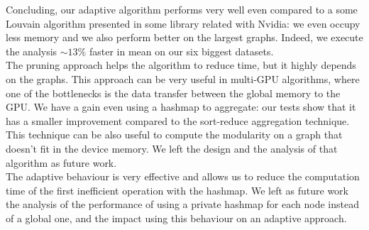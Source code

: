 Concluding, our adaptive algorithm performs very well even compared to a some Louvain algorithm presented in some library related with Nvidia: we even occupy less memory and we also perform better on the largest graphs. Indeed, we execute the analysis $\sim 13\%$ faster in mean on our six biggest datasets.\\ The pruning approach helps the algorithm to reduce time, but it highly depends on the graphs. This approach can be very useful in multi-GPU algorithms, where one of the bottlenecks is the data transfer between the global memory to the GPU. We have a gain even using a hashmap to aggregate: our tests show that it has a smaller improvement compared to the sort-reduce aggregation technique. This technique can be also useful to compute the modularity on a graph that doesn't fit in the device memory. We left the design and the analysis of that algorithm as future work. \\
The adaptive behaviour is very effective and allows us to reduce the computation time of the first inefficient operation with the hashmap. We left as future work the analysis of the performance of using a private hashmap for each node instead of a global one, and the impact using this behaviour on an adaptive approach.

